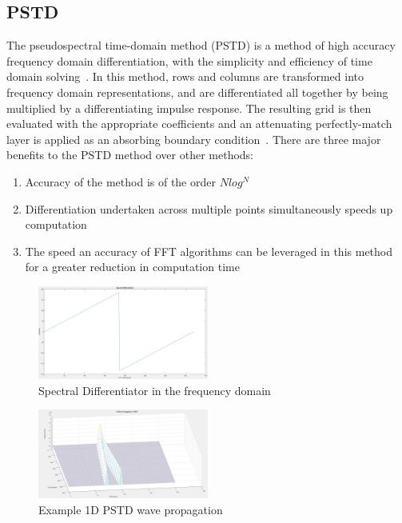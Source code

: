 \documentclass{svproc}
\begin{document}
\subsection{PSTD}
The pseudospectral time-domain method (PSTD) is a method of high accuracy frequency domain differentiation, with the simplicity and efficiency of time domain solving~\cite{Hornikx2016}. In this method, rows and columns are transformed into frequency domain representations, and are differentiated all together by being multiplied by a differentiating impulse response. The resulting grid is then evaluated with the appropriate coefficients and an attenuating perfectly-match layer is applied as an absorbing boundary condition~\cite{Angus2010}. There are three major benefits to the PSTD method over other methods:
\begin{enumerate}
\item Accuracy of the method is of the order $Nlog^N$
\item Differentiation undertaken across multiple points simultaneously speeds up computation
\item The speed an accuracy of FFT algorithms can be leveraged in this method for a greater reduction in computation time
\end{enumerate}

\begin{figure}
\centering
\includegraphics[width=0.5\textwidth]{spectraldiff.jpg}
\caption{Spectral Differentiator in the frequency domain~\cite{Durbridg2016}}
\end{figure}
\begin{figure}
\centering
\includegraphics[width=0.5\textwidth]{pstdexamp.jpg}
\caption{Example 1D PSTD wave propagation~\cite{Durbridg2016}}
\end{figure}
\end{document}

